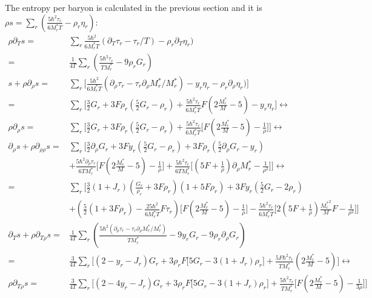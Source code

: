 \documentclass[preprint,prc,preprintnumbers,superscriptaddress,amsmath,amssymb,floatfix]{revtex4-1}
\begin{document}
The entropy per baryon is calculated in the previous section and it is $\rho s=\sum_r(\frac{5 \hbar^2\tau_r}{6M_r^{*}T}-\rho_r \eta_r)$:
\begin{equation}
 \begin{split}
 \rho \partial_{T}s=&\sum_r \frac{5 \hbar^2}{6M_r^{*}T}(\partial_T\tau_r-\tau_r/T)-\rho_r\partial_T\eta_r)\\
 =&\frac{1}{4T}\sum_r(\frac{5\hbar^2\tau_r}{TM_r^{*}}-9\rho_r G_r)\\ 
 s+\rho \partial_{\rho}s=&\sum_r\Big[\frac{5 \hbar^2}{6M_r^{*}T}(\partial_{\rho}\tau_r-\tau_r \partial_{\rho}M^{*}_r/M_r^{*})-y_r\eta_r-\rho_r\partial_{\rho}\eta_r)\Big]\\
 =&\sum_r\Big[\frac{3}{2}G_r+3F\rho_r(\frac{5}{2}G_r-\rho_r)+\frac{5\hbar^2\tau_r}{6M_r^{*}T}F(2\frac{M_r^{*}}{M}-5)-y_r\eta_r\Big]\leftrightarrow \\
 \rho \partial_{\rho}s=&\sum_r\Big[\frac{3}{2}G_r+3F\rho_r(\frac{5}{2}G_r-\rho_r)+\frac{5\hbar^2\tau_r}{6M_r^{*}T}\big[F(2\frac{M_r^{*}}{M}-5)-\frac{1}{\rho}\big]\Big]\leftrightarrow \\
 \partial_{\rho}s+\rho \partial_{\rho \rho}s=&\sum_r\Big[\frac{3}{2}\partial_{\rho}G_r+3F y_r(\frac{5}{2}G_r-\rho_r)+3F\rho_r(\frac{5}{2}\partial_{\rho}G_r-y_r)\\
 &+\frac{5\hbar^2\partial_{\rho}\tau_r}{6TM_r^{*}}\big[F(2\frac{M_r^{*}}{M}-5)-\frac{1}{\rho}\big]+\frac{5\hbar^2\tau_r}{6TM_r^{*}}\big[(5F+\frac{1}{\rho})\partial_{\rho}M_r^{*}-\frac{1}{\rho^2}\big]\Big]\leftrightarrow \\
=&\sum_r\Big[\frac{3}{2}(1+J_r)(\frac{G_r}{\rho_r}+3F\rho_r)(1+5F\rho_r)+3Fy_r(\frac{5}{2}G_r-2\rho_r)\\
&+(\frac{5}{2}(1+3F\rho_r)-\frac{25 \hbar^2}{6 M_r^{*}T}F\tau_r)\big[F(2\frac{M_r^{*}}{M}-5)-\frac{1}{\rho}\big]-\frac{5 \hbar^2 \tau_r}{6M_r^{*}T}\big[2(5F+\frac{1}{\rho})\frac{{M_r^{*}}^2}{M}F-\frac{1}{\rho^2}\big]\Big]\\
 \partial_{T}s +\rho \partial_{T\rho}s=&\frac{1}{4T}\sum_r(\frac{5\hbar^2(\partial_{\rho}\tau_r-\tau_r \partial_{\rho}M^{*}_r/M_r^{*})}{TM_r^{*}}-9y_r G_r-9\rho_r \partial_{\rho}G_r)\\
 =&\frac{3}{4T}\sum_r\Big[(2-y_r-J_r)G_r+3\rho_r F\big[5G_r-3(1+J_r)\rho_r\big]+\frac{5F\hbar^2\tau_r}{TM_r^{*}}(2\frac{M^{*}_r}{M}-5)\Big]\leftrightarrow\\
 \rho \partial_{T\rho}s=&\frac{3}{4T}\sum_r\Big[(2-4y_r-J_r)G_r+3\rho_r F\big[5G_r-3(1+J_r)\rho_r\big]+\frac{5\hbar^2\tau_r}{TM_r^{*}}\big[F(2\frac{M^{*}_r}{M}-5)-\frac{1}{3\rho}\big]\Big]\\

\end{split}
\end{equation}
\end{document}
